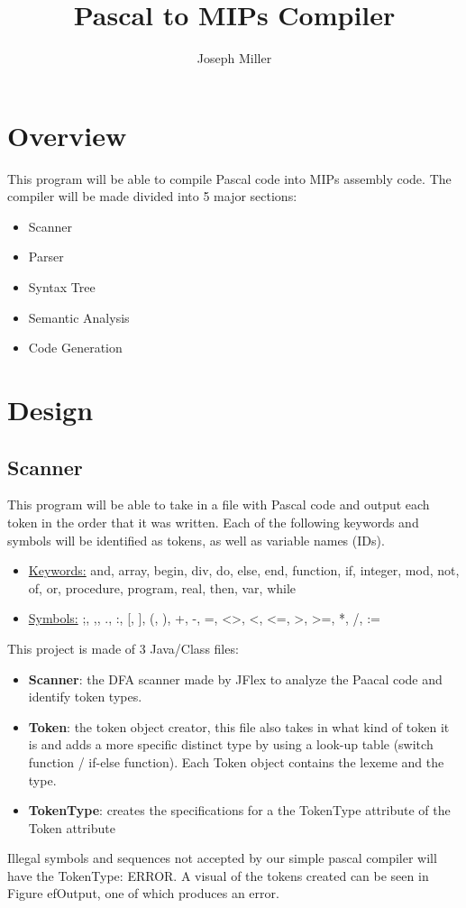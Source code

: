 \documentclass[english]{article}
\begin{document}
\title{Pascal to MIPs Compiler}
\author{Joseph Miller}
\maketitle


\section{Overview}

This program will be able to compile Pascal code into MIPs assembly code.  The compiler will be made divided into 5 major sections:

\begin{itemize}
\item
Scanner
\item
Parser
\item
Syntax Tree
\item
Semantic Analysis
\item
Code Generation
\end{itemize}


\par\addvspace{1cm}%
\section{Design}

\subsection{Scanner}

This program will be able to take in a file with Pascal code and output each token in the order that it was written. Each of the following keywords and symbols will be identified as tokens, as well as variable names (IDs).


\begin{itemize}
\item
\underline{Keywords:} and, array, begin, div, do, else, end, function, if, integer, mod, not, of, or, procedure, program, real, then, var, while
\item
\underline{Symbols:} ;, ,, ., :, [, ], (, ), +, -, =, \textless\textgreater, \textless, \textless=, \textgreater, \textgreater=, *, /, :=
\end{itemize}
This project is made of 3 Java/Class files:
\begin{itemize}

\item
\textbf{Scanner}: the DFA scanner made by JFlex to analyze the Paacal code and identify token types.
\item
\textbf{Token}: the token object creator, this file also takes in what kind of token it is and adds a more specific distinct type by using a look-up table (switch function / if-else function). Each Token object contains the lexeme and the type.
\item
\textbf{TokenType}: creates the specifications for a the TokenType attribute of the Token attribute
\end{itemize}
Illegal symbols and sequences not accepted by our simple pascal compiler will have the TokenType: ERROR. A visual of the tokens created can be seen in Figure ef{Output}, one of which produces an error.
\end{document}
